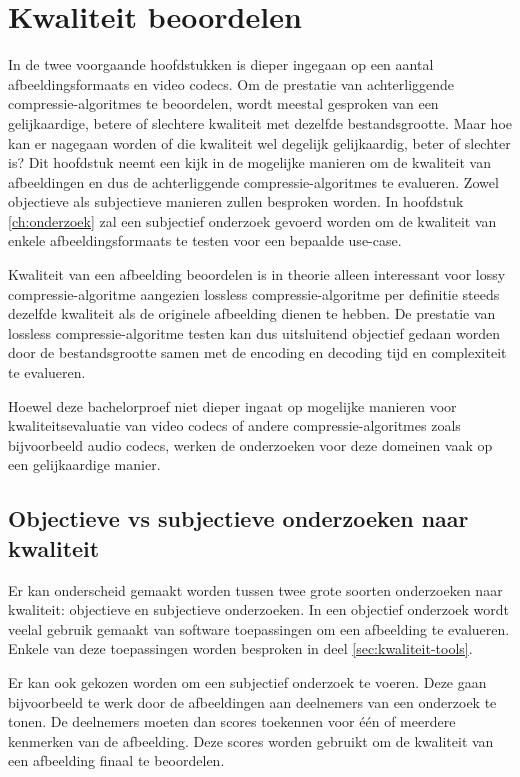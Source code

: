 \chapter{Kwaliteit beoordelen}
\label{ch:kwaliteit}

In de twee voorgaande hoofdstukken is dieper ingegaan op een aantal \glspl{afbeeldingsformaat} en video \glspl{codec}. Om de prestatie van achterliggende \glspl{compressie-algoritme} te beoordelen, wordt meestal gesproken van een gelijkaardige, betere of slechtere kwaliteit met dezelfde bestandsgrootte. Maar hoe kan er nagegaan worden of die kwaliteit wel degelijk gelijkaardig, beter of slechter is? Dit hoofdstuk neemt een kijk in de mogelijke manieren om de kwaliteit van afbeeldingen en dus de achterliggende \glspl{compressie-algoritme} te evalueren. Zowel objectieve als subjectieve manieren zullen besproken worden. In hoofdstuk \ref{ch:onderzoek} zal een subjectief onderzoek gevoerd worden om de kwaliteit van enkele \glspl{afbeeldingsformaat} te testen voor een bepaalde \gls{use-case}. 

Kwaliteit van een afbeelding beoordelen is in theorie alleen interessant voor \gls{lossy} \gls{compressie-algoritme} aangezien \gls{lossless} \gls{compressie-algoritme} per definitie steeds dezelfde kwaliteit als de originele afbeelding dienen te hebben. De prestatie van \gls{lossless} \gls{compressie-algoritme} testen kan dus uitsluitend objectief gedaan worden door de bestandsgrootte samen met de \gls{encoding} en \gls{decoding} tijd en complexiteit te evalueren.

Hoewel deze bachelorproef niet dieper ingaat op mogelijke manieren voor kwaliteitsevaluatie van video \glspl{codec} of andere \glspl{compressie-algoritme} zoals bijvoorbeeld audio \glspl{codec}, werken de onderzoeken voor deze domeinen vaak op een gelijkaardige manier.

\section{Objectieve vs subjectieve onderzoeken naar kwaliteit}
\label{sec:kwaliteit-objectief-subjectief}

Er kan onderscheid gemaakt worden tussen twee grote soorten onderzoeken naar kwaliteit: objectieve en subjectieve onderzoeken. In een objectief onderzoek wordt veelal gebruik gemaakt van software toepassingen om een afbeelding te evalueren. Enkele van deze toepassingen worden besproken in deel \ref{sec:kwaliteit-tools}. 
	
Er kan ook gekozen worden om een subjectief onderzoek te voeren. Deze gaan bijvoorbeeld te werk door de afbeeldingen aan deelnemers van een onderzoek te tonen. De deelnemers moeten dan scores toekennen voor één of meerdere kenmerken van de afbeelding. Deze scores worden gebruikt om de kwaliteit van een afbeelding finaal te beoordelen. 

